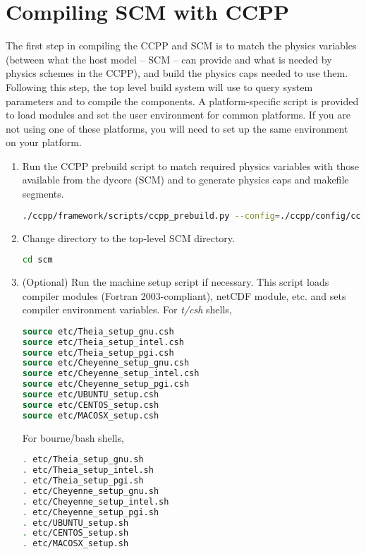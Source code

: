 \section{Compiling SCM with CCPP}
\label{section: compiling}
The first step in compiling the CCPP and SCM is to match the physics variables (between what the host model -- SCM -- can provide and what is needed by physics schemes in the CCPP), and build the physics caps needed to use them.  Following this step, the top level build system will use  to query system parameters and  to compile the components.  A platform-specific script is provided to load modules and set the user environment for common platforms.  If you are not using one of these platforms, you will need to set up the same environment on your platform.
\begin{enumerate}
    \item Run the CCPP prebuild script to match required physics variables with those available from the dycore (SCM) and to generate physics caps and makefile segments.
\begin{lstlisting}[language=bash]
./ccpp/framework/scripts/ccpp_prebuild.py --config=./ccpp/config/ccpp_prebuild_config.py [--debug]
\end{lstlisting}
    \item Change directory to the top-level SCM directory.
\begin{lstlisting}[language=bash]
cd scm
\end{lstlisting}
    \item (Optional) Run the machine setup script if necessary. This script loads compiler modules (Fortran 2003-compliant), netCDF module, etc. and sets compiler environment variables. For \textit{t/csh} shells,
\begin{lstlisting}[language=csh]
source etc/Theia_setup_gnu.csh
source etc/Theia_setup_intel.csh
source etc/Theia_setup_pgi.csh
source etc/Cheyenne_setup_gnu.csh
source etc/Cheyenne_setup_intel.csh
source etc/Cheyenne_setup_pgi.csh
source etc/UBUNTU_setup.csh
source etc/CENTOS_setup.csh
source etc/MACOSX_setup.csh
\end{lstlisting}
For bourne/bash shells,
\begin{lstlisting}[language=bash]
. etc/Theia_setup_gnu.sh
. etc/Theia_setup_intel.sh
. etc/Theia_setup_pgi.sh
. etc/Cheyenne_setup_gnu.sh
. etc/Cheyenne_setup_intel.sh
. etc/Cheyenne_setup_pgi.sh
. etc/UBUNTU_setup.sh
. etc/CENTOS_setup.sh
. etc/MACOSX_setup.sh
\end{lstlisting}

\end{enumerate}
